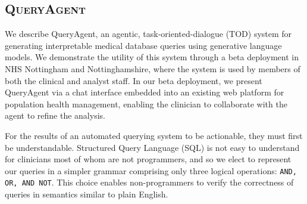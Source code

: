 \documentclass[11pt]{article}
\begin{document}



\subsection{\textsc{QueryAgent}}
We describe QueryAgent, an agentic, task-oriented-dialogue (TOD) system for generating interpretable medical database queries using generative language models. We demonstrate the utility of this system through a beta deployment in NHS Nottingham and Nottinghamshire, where the system is used by members of both the clinical and analyst staff.
In our beta deployment, we present QueryAgent via a chat interface embedded into an existing web platform for population health management, enabling the clinician to collaborate with the agent to refine the analysis. %

For the results of an automated querying system to be actionable, they must first be understandable.
Structured Query Language (SQL) is not easy to understand for clinicians most of whom are not programmers, and so we elect to represent our queries in a simpler grammar comprising only three logical operations: \texttt{AND, OR, AND NOT}.
This choice enables non-programmers to verify the correctness of queries in semantics similar to plain English.

\end{document}
